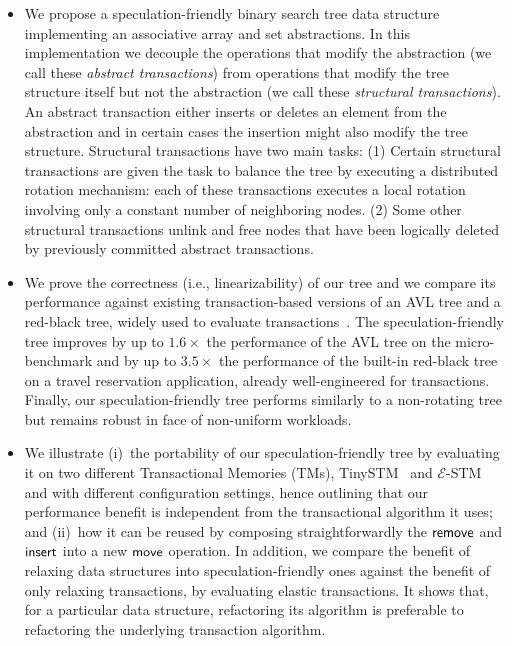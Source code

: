 \begin{itemize}
\item We propose a speculation-friendly binary search tree data structure
implementing an associative array and set abstractions.
In this implementation we decouple the operations that modify the abstraction (we call these \emph{abstract transactions}) from operations
that modify the tree structure itself but not the abstraction (we call these \emph{structural transactions}).
An abstract transaction either inserts or deletes an element from the abstraction and 
in certain cases the insertion might also modify the tree structure.
Structural transactions have two main tasks:
(1) Certain structural transactions are given the task to balance the tree 
by executing a distributed rotation mechanism: each of these transactions executes a local rotation involving
only a constant number of neighboring nodes. 
(2) Some other structural transactions unlink and free nodes that have been logically deleted 
by previously committed abstract transactions.

\item We prove the correctness (i.e., linearizability) of our tree and we compare its performance against existing transaction-based versions of an AVL tree and a red-black tree,
widely used to evaluate transactions~\cite{DSS06,HLMS03,CCKO08,HK08,FFR08,YNW+08,DFGG11}.
The speculation-friendly tree improves by up to $1.6\times$ the performance of the AVL tree on the micro-benchmark and 
by up to $3.5\times$ the performance of the built-in red-black tree on a travel reservation application, already well-engineered for transactions.
Finally, our speculation-friendly tree performs similarly to a non-rotating tree but remains robust in face of non-uniform workloads.

\item We illustrate (i)~the portability of our speculation-friendly tree by evaluating it on two different Transactional Memories (TMs), TinySTM~\cite{FFR08} 
and $\mathcal{E}$-STM~\cite{FGG09} and with different configuration settings, hence outlining that our performance benefit is independent 
from the transactional algorithm it uses; and (ii)~how it can be reused by composing 
straightforwardly the $\lit{remove}$ and $\lit{insert}$ into a new $\lit{move}$ operation.
In addition, we compare the benefit of relaxing data structures into speculation-friendly ones against the benefit of only relaxing transactions,
by evaluating elastic transactions.
It shows that, for a particular data structure, refactoring its algorithm is preferable to refactoring the underlying transaction algorithm.
\end{itemize}

